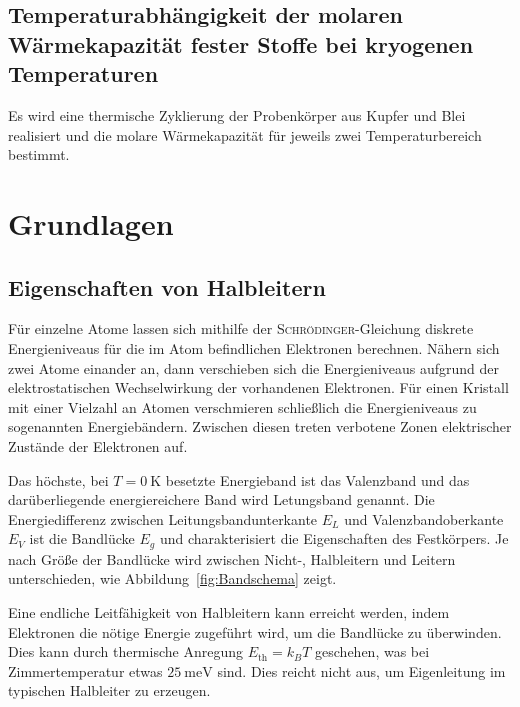 \documentclass[parskip=half, a4paper,twoside,final]{article}
\begin{document}
\subsection{Temperaturabhängigkeit der molaren Wärmekapazität fester Stoffe bei kryogenen Temperaturen}

Es wird eine thermische Zyklierung der Probenkörper aus Kupfer und Blei realisiert und die molare Wärmekapazität für jeweils zwei Temperaturbereich bestimmt.



\newpage
\section{Grundlagen} \label{sec:Grundlagen}

\subsection{Eigenschaften von Halbleitern}
Für einzelne Atome lassen sich mithilfe der \textsc{Schrödinger}-Gleichung diskrete Energieniveaus für die im Atom befindlichen Elektronen berechnen. Nähern sich zwei Atome einander an, dann verschieben sich die Energieniveaus aufgrund der elektrostatischen Wechselwirkung der vorhandenen Elektronen. Für einen Kristall mit einer Vielzahl an Atomen verschmieren schließlich die Energieniveaus zu sogenannten Energiebändern. Zwischen diesen treten verbotene Zonen elektrischer Zustände der Elektronen auf.

Das höchste, bei $T=\SI{0}{\kelvin}$ besetzte Energieband ist das Valenzband und das darüberliegende energiereichere Band wird Letungsband genannt. Die Energiedifferenz zwischen Leitungsbandunterkante $E_L$ und Valenzbandoberkante $E_V$ ist die Bandlücke $E_g$ und charakterisiert die Eigenschaften des Festkörpers. Je nach Größe der Bandlücke wird zwischen Nicht-, Halbleitern und Leitern unterschieden, wie Abbildung~\ref{fig:Bandschema} zeigt.



Eine endliche Leitfähigkeit von Halbleitern kann erreicht werden, indem Elektronen die nötige Energie zugeführt wird, um die Bandlücke zu überwinden. Dies kann durch thermische Anregung $E_\text{th} = k_B T$ geschehen, was bei Zimmertemperatur etwas $\SI{25}{\milli\electronvolt}$ sind. Dies reicht nicht aus, um Eigenleitung im typischen Halbleiter zu erzeugen.
\end{document}
